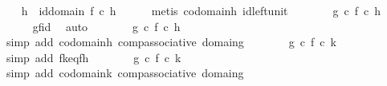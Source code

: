 \begin{isabellebody}
\isanewline
\ \ \isamarkupfalse%
\ {\isachardoublequoteopen}h\ {\isacharequal}{\kern0pt}\ id{\isacharparenleft}{\kern0pt}domain\ f{\isacharparenright}{\kern0pt}\ {\isasymcirc}\isactrlsub c\ h{\isachardoublequoteclose}\isanewline
\ \ \ \ \isamarkupfalse%
\ {\isacharparenleft}{\kern0pt}metis\ codomain{\isacharunderscore}{\kern0pt}h\ id{\isacharunderscore}{\kern0pt}left{\isacharunderscore}{\kern0pt}unit{\isacharparenright}{\kern0pt}\isanewline
\ \ \isamarkupfalse%
\ \isamarkupfalse%
\ {\isachardoublequoteopen}{\isachardot}{\kern0pt}{\isachardot}{\kern0pt}{\isachardot}{\kern0pt}\ {\isacharequal}{\kern0pt}\ {\isacharparenleft}{\kern0pt}g\ {\isasymcirc}\isactrlsub c\ f{\isacharparenright}{\kern0pt}\ {\isasymcirc}\isactrlsub c\ h{\isachardoublequoteclose}\isanewline
\ \ \ \ \isamarkupfalse%
\ gf{\isacharunderscore}{\kern0pt}id\ \isamarkupfalse%
\ auto\isanewline
\ \ \isamarkupfalse%
\ \isamarkupfalse%
\ {\isachardoublequoteopen}{\isachardot}{\kern0pt}{\isachardot}{\kern0pt}{\isachardot}{\kern0pt}\ {\isacharequal}{\kern0pt}\ g\ {\isasymcirc}\isactrlsub c\ {\isacharparenleft}{\kern0pt}f\ {\isasymcirc}\isactrlsub c\ h{\isacharparenright}{\kern0pt}{\isachardoublequoteclose}\isanewline
\ \ \ \ \isamarkupfalse%
\ {\isacharparenleft}{\kern0pt}simp\ add{\isacharcolon}{\kern0pt}\ codomain{\isacharunderscore}{\kern0pt}h\ comp{\isacharunderscore}{\kern0pt}associative\ domain{\isacharunderscore}{\kern0pt}g{\isacharparenright}{\kern0pt}\isanewline
\ \ \isamarkupfalse%
\ \isamarkupfalse%
\ {\isachardoublequoteopen}{\isachardot}{\kern0pt}{\isachardot}{\kern0pt}{\isachardot}{\kern0pt}\ {\isacharequal}{\kern0pt}\ g\ {\isasymcirc}\isactrlsub c\ {\isacharparenleft}{\kern0pt}f\ {\isasymcirc}\isactrlsub c\ k{\isacharparenright}{\kern0pt}{\isachardoublequoteclose}\isanewline
\ \ \ \ \isamarkupfalse%
\ {\isacharparenleft}{\kern0pt}simp\ add{\isacharcolon}{\kern0pt}\ fk{\isacharunderscore}{\kern0pt}eq{\isacharunderscore}{\kern0pt}fh{\isacharparenright}{\kern0pt}\isanewline
\ \ \isamarkupfalse%
\ \isamarkupfalse%
\ {\isachardoublequoteopen}{\isachardot}{\kern0pt}{\isachardot}{\kern0pt}{\isachardot}{\kern0pt}\ {\isacharequal}{\kern0pt}\ {\isacharparenleft}{\kern0pt}g\ {\isasymcirc}\isactrlsub c\ f{\isacharparenright}{\kern0pt}\ {\isasymcirc}\isactrlsub c\ k{\isachardoublequoteclose}\isanewline
\ \ \ \ \isamarkupfalse%
\ {\isacharparenleft}{\kern0pt}simp\ add{\isacharcolon}{\kern0pt}\ codomain{\isacharunderscore}{\kern0pt}k\ comp{\isacharunderscore}{\kern0pt}associative\ domain{\isacharunderscore}{\kern0pt}g{\isacharparenright}{\kern0pt}\isanewline

\end{isabellebody}

